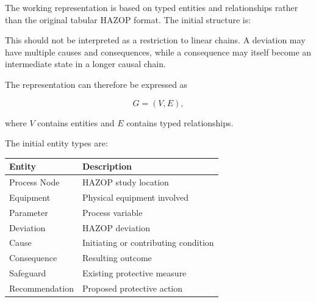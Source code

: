 The working representation is based on typed entities and relationships
rather than the original tabular HAZOP format. The initial structure is:

\begin{center}
\end{center}

This should not be interpreted as a restriction to linear chains. A
deviation may have multiple causes and consequences, while a
consequence may itself become an intermediate state in a longer causal
chain.

The representation can therefore be expressed as

\[
G=(V,E),
\]

where \(V\) contains entities and \(E\) contains typed relationships.

The initial entity types are:

\begin{center}
\begin{tabular}{ll}
\textbf{Entity} & \textbf{Description} \\
\hline
Process Node & HAZOP study location \\
Equipment & Physical equipment involved \\
Parameter & Process variable \\
Deviation & HAZOP deviation \\
Cause & Initiating or contributing condition \\
Consequence & Resulting outcome \\
Safeguard & Existing protective measure \\
Recommendation & Proposed protective action
\end{tabular}
\end{center}

